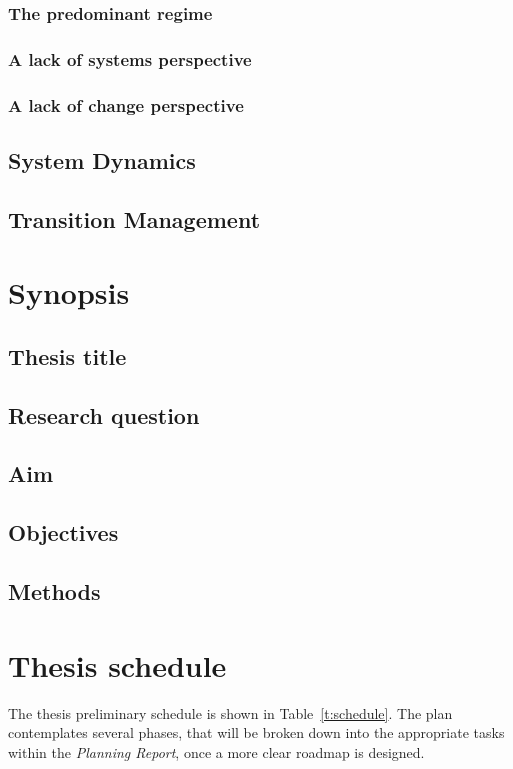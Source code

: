 \documentclass[a4paper,fontsize=10pt,bibliography=totoc]{scrartcl}
\newcommand{\tref}[1]{Table~\ref{#1}}
\begin{document}
\begin{multicols*}{2}
\subsubsection{The predominant regime}
\subsubsection{A lack of systems perspective}
\subsubsection{A lack of change perspective}
\subsection{System Dynamics}
\subsection{Transition Management}

\section{Synopsis}
\label{s:synopsis}
\subsection{Thesis title}
\subsection{Research question}
\subsection{Aim}
\subsection{Objectives}
\subsection{Methods}

\section{Thesis schedule}
The thesis preliminary schedule is shown in \tref{t:schedule}. The plan contemplates several phases, that will be broken down into the appropriate tasks within the \textit{Planning Report}, once a more clear roadmap is designed.  

\printbibliography

\end{multicols*}
\end{document}

